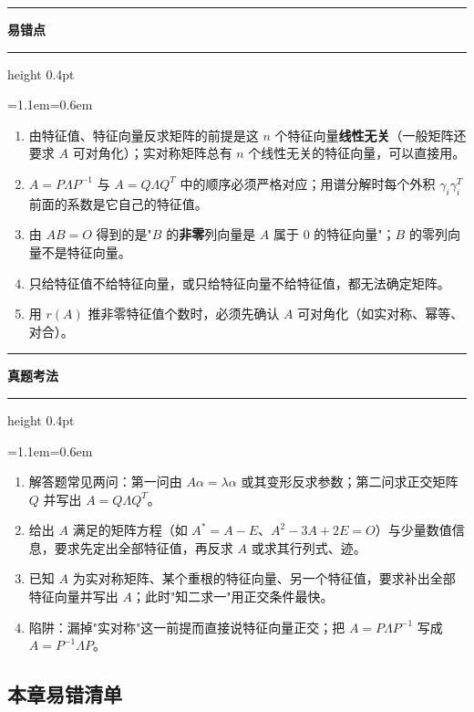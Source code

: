\documentclass[11pt,openany,UTF8]{ctexbook}
\newcommand{\callouthead}[2]{%
  \par\addvspace{7pt}\noindent
  {\color{#1}\rule[-0.15em]{3pt}{1.05em}}\hspace{0.5em}%
  {\bfseries\color{#1}#2}\par\nobreak\vspace{-0.35em}%
  {\color{rulesep}\hrule height 0.4pt}\nobreak\vspace{0.45em}%
  \begingroup\small\setlength{\parindent}{0pt}%
  \leftskip=1.1em\rightskip=0.6em\noindent\ignorespaces}
\newcommand{\calloutend}{\par\endgroup\addvspace{7pt}}
\newenvironment{callwarn}[1]{\callouthead{warnbar}{#1}}{\calloutend}
\newenvironment{callexam}[1]{\callouthead{exambar}{#1}}{\calloutend}
\begin{document}
\begin{callwarn}{易错点}
\begin{enumerate}
\item 由特征值、特征向量反求矩阵的前提是这 $n$ 个特征向量\textbf{线性无关}（一般矩阵还要求 $A$ 可对角化）；实对称矩阵总有 $n$ 个线性无关的特征向量，可以直接用。
\item $A=P\Lambda P^{-1}$ 与 $A=Q\Lambda Q^T$ 中的顺序必须严格对应；用谱分解时每个外积 $\gamma_i\gamma_i^T$ 前面的系数是它自己的特征值。
\item 由 $AB=O$ 得到的是"$B$ 的\textbf{非零}列向量是 $A$ 属于 $0$ 的特征向量"；$B$ 的零列向量不是特征向量。
\item 只给特征值不给特征向量，或只给特征向量不给特征值，都无法确定矩阵。
\item 用 $r(A)$ 推非零特征值个数时，必须先确认 $A$ 可对角化（如实对称、幂等、对合）。
\end{enumerate}
\end{callwarn}

\begin{callexam}{真题考法}
\begin{enumerate}
\item 解答题常见两问：第一问由 $A\alpha=\lambda\alpha$ 或其变形反求参数；第二问求正交矩阵 $Q$ 并写出 $A=Q\Lambda Q^T$。
\item 给出 $A$ 满足的矩阵方程（如 $A^*=A-E$、$A^2-3A+2E=O$）与少量数值信息，要求先定出全部特征值，再反求 $A$ 或求其行列式、迹。
\item 已知 $A$ 为实对称矩阵、某个重根的特征向量、另一个特征值，要求补出全部特征向量并写出 $A$；此时"知二求一"用正交条件最快。
\item 陷阱：漏掉"实对称"这一前提而直接说特征向量正交；把 $A=P\Lambda P^{-1}$ 写成 $A=P^{-1}\Lambda P$。
\end{enumerate}
\end{callexam}

\subsection*{本章易错清单}
\end{document}
